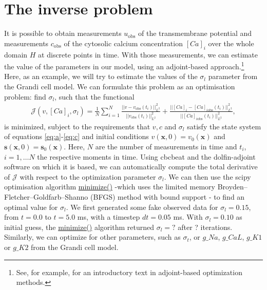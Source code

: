 \documentclass[12pt,a4paper]{article}
\begin{document}
\section{The inverse problem} \label{The inverse problem}
It is possible to obtain measurements $u_{\text{obs}}$ of the transmembrane potential and measurements $c_{\text{obs}}$ of the cytosolic calcium concentration $[Ca]_i$ over the whole domain $H$ at discrete points in time. With those measurements, we can estimate the value of the parameters in our model, using an adjoint-based approach.\footnote{See, for example, \cite{Gunzburger} for an introductory text in adjoint-based optimization methods.} Here, as an example, we will try to estimate the values of the $\sigma_l$ parameter from the Grandi cell model.
We can formulate this problem as an optimisation problem: find $\sigma_l$, such that the functional
\begin{eqnarray}
\mathcal{J}(v, [Ca]_i, \sigma_l)= \frac{1}{N} \sum_{i=1}^{N} \frac{||v-v_{\text{obs}}(t_i)||^2_{L^2}}{||v_{\text{obs}}(t_i)||^2_{L^2}} + \frac{||[Ca]_i-[Ca]_{i\text{obs}}(t_i) ||^2_{L^2}}{||[Ca]_{i\text{obs}}(t_i) ||^2_{L^2}},\label{J}
\end{eqnarray}
is minimized, subject to the requirements that $v, c$ and $\sigma_l$ satisfy the state system of equations \eqref{eq:a}-\eqref{eq:c} and initial conditions $v(\textbf{x},0)=v_0(\textbf{x})$ and $\mathbf{s}(\mathbf{x},0)=\mathbf{s}_0(\mathbf{x})$. Here, $N$ are the number of measurements in time and $t_i$, $i=1, \dots N$ the respective moments in time.
Using cbcbeat and the dolfin-adjoint software on which it is based, we can automatically compute the total derivative of $\mathcal{J}$ with respect to the optimization parameter $\sigma_l$. We can then use the scipy optimisation algorithm \url{minimize()} -which uses the limited memory Broyden–Fletcher–Goldfarb–Shanno (BFGS) method with bound support - to find an optimal value for $\sigma_l$. We first generated some fake observed data for $\sigma_l=0.15$, from $t=0.0$ to $t=5.0$ ms, with a timestep $dt=0.05$ ms. With $\sigma_l=0.10$ as initial guess, the \url{minimize()} algorithm returned $\sigma_l=?$ after ? iterations. Similarly, we can optimize for other parameters, such as $\sigma_t$, or $g\_Na$, $g\_CaL$, $g\_K1$ or $g\_K2$ from the Grandi cell model. 
\end{document}
